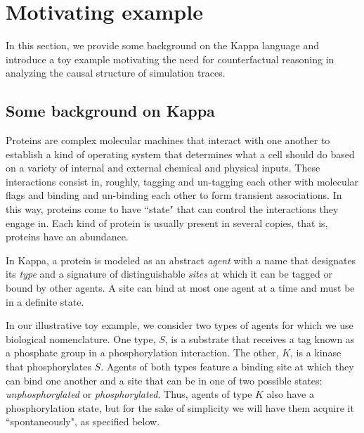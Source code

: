
\section{Motivating example}\label{sec:example}

In this section, we provide some background on the Kappa language and introduce a toy example motivating the need for counterfactual reasoning in analyzing the causal structure of simulation traces.


\subsection{Some background on Kappa}\label{sec:background}

Proteins are complex molecular machines that interact with one another to establish a kind of operating system that determines what a cell should do based on a variety of internal and external chemical and physical inputs. These interactions consist in, roughly, tagging and un-tagging each other with molecular flags and binding and un-binding each other to form transient associations. In this way, proteins come to have ``state" that can control the interactions they engage in. Each kind of protein is usually present in several copies, that is, proteins have an abundance.
 
In Kappa, a protein is modeled as an abstract \emph{agent} with a name that designates its \emph{type} and a signature of distinguishable \emph{sites} at which it can be tagged or bound by other agents. A site can bind at most one agent at a time and must be in a definite state. 

In our illustrative toy example, we consider two types of agents for which we use biological nomenclature. One type, $S$, is a substrate that receives a tag known as a phosphate group in a phosphorylation interaction. The other, $K$, is a kinase that phosphorylates $S$. Agents of both types feature a binding site at which they can bind one another and a site that can be in one of two possible states: \emph{unphosphorylated} or \emph{phosphorylated}. Thus, agents of type $K$ also have a phosphorylation state, but for the sake of simplicity we will have them acquire it ``spontaneously", as specified below.

